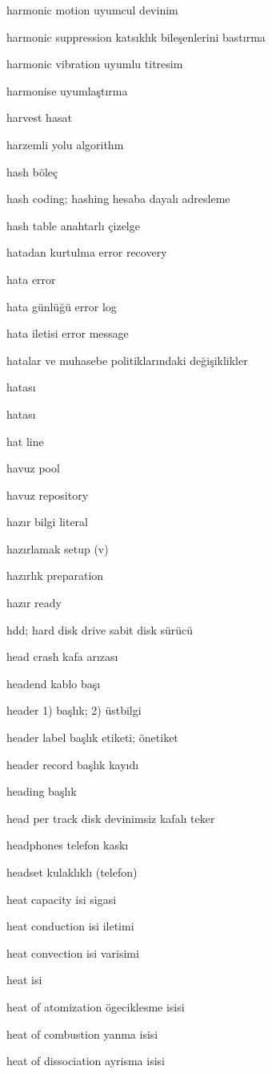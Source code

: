 \documentclass[12pt,fleqn]{article}\usepackage{../../common}
\begin{document}
harmonic motion uyumcul devinim

harmonic suppression katsıklık bileşenlerini bastırma

harmonic vibration uyumlu titresim

harmonise uyumlaştırma

harvest hasat

harzemli yolu algorithm

hash böleç

hash coding; hashing hesaba dayalı adresleme

hash table anahtarlı çizelge

hatadan kurtulma error recovery

hata error

hata günlüğü error log

hata iletisi error message

hatalar ve muhasebe politiklarındaki değişiklikler

hatası

hatası

hat line

havuz pool

havuz repository

hazır bilgi literal

hazırlamak setup (v)

hazırlık preparation

hazır ready

hdd; hard disk drive sabit disk sürücü

head crash kafa arızası

headend kablo başı

header 1) başlık; 2) üstbilgi

header label başlık etiketi; önetiket

header record başlık kayıdı

heading başlık

head per track disk devinimsiz kafalı teker

headphones telefon kaskı

headset kulaklıklı (telefon)

heat capacity isi sigasi

heat conduction isi iletimi

heat convection isi varisimi

heat isi

heat of atomization ögeciklesme isisi

heat of combustion yanma isisi

heat of dissociation ayrisma isisi
\end{document}
